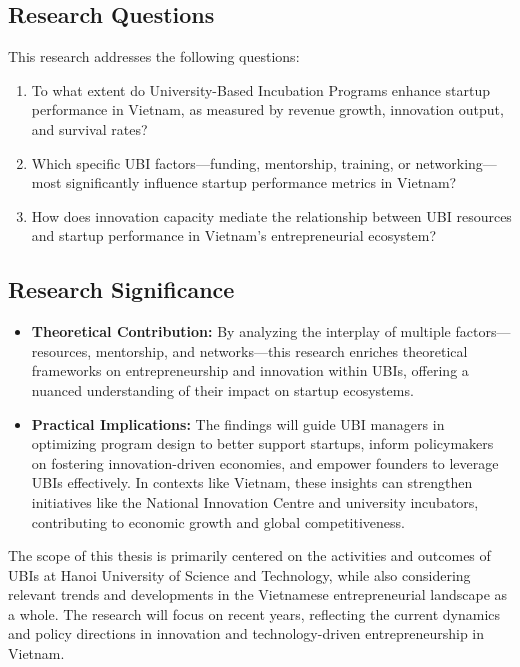 \documentclass[../Main.tex]{subfiles}
\begin{document}
	\subsection{Research Questions}
	This research addresses the following questions:
	\begin{enumerate}
		\item To what extent do University-Based Incubation Programs enhance startup performance in Vietnam, as measured by revenue growth, innovation output, and survival rates?
		\item Which specific UBI factors—funding, mentorship, training, or networking—most significantly influence startup performance metrics in Vietnam?
		\item How does innovation capacity mediate the relationship between UBI resources and startup performance in Vietnam's entrepreneurial ecosystem?
	\end{enumerate}

	\subsection{Research Significance}
	\begin{itemize}
		\item \textbf{Theoretical Contribution:} By analyzing the interplay of multiple factors—resources, mentorship, and networks—this research enriches theoretical frameworks on entrepreneurship and innovation within UBIs, offering a nuanced understanding of their impact on startup ecosystems.
		\item \textbf{Practical Implications:} The findings will guide UBI managers in optimizing program design to better support startups, inform policymakers on fostering innovation-driven economies, and empower founders to leverage UBIs effectively. In contexts like Vietnam, these insights can strengthen initiatives like the National Innovation Centre and university incubators, contributing to economic growth and global competitiveness.
	\end{itemize}

	\begin{condensed_idea}
		The scope of this thesis is primarily centered on the activities and outcomes of UBIs at Hanoi University of Science and Technology, while also considering relevant trends and developments in the Vietnamese entrepreneurial landscape as a whole. The research will focus on recent years, reflecting the current dynamics and policy directions in innovation and technology-driven entrepreneurship in Vietnam.
	\end{condensed_idea}
\end{document}
